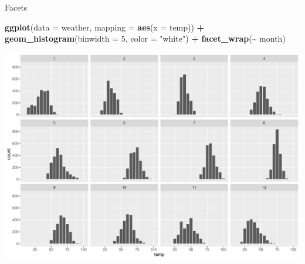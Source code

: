 \documentclass[
  ignorenonframetext,
]{beamer}
\newenvironment{Shaded}{\begin{snugshade}}{\end{snugshade}}
\newcommand{\AttributeTok}[1]{\textcolor[rgb]{0.13,0.29,0.53}{#1}}
\newcommand{\DecValTok}[1]{\textcolor[rgb]{0.00,0.00,0.81}{#1}}
\newcommand{\FunctionTok}[1]{\textcolor[rgb]{0.13,0.29,0.53}{\textbf{#1}}}
\newcommand{\NormalTok}[1]{#1}
\newcommand{\SpecialCharTok}[1]{\textcolor[rgb]{0.81,0.36,0.00}{\textbf{#1}}}
\newcommand{\StringTok}[1]{\textcolor[rgb]{0.31,0.60,0.02}{#1}}
\begin{document}
\begin{frame}[fragile]{Facets}
\protect\hypertarget{facets-1}{}
\tiny

\begin{Shaded}
\begin{Highlighting}[]
\FunctionTok{ggplot}\NormalTok{(}\AttributeTok{data =}\NormalTok{ weather, }\AttributeTok{mapping =} \FunctionTok{aes}\NormalTok{(}\AttributeTok{x =}\NormalTok{ temp)) }\SpecialCharTok{+}
  \FunctionTok{geom\_histogram}\NormalTok{(}\AttributeTok{binwidth =} \DecValTok{5}\NormalTok{, }\AttributeTok{color =} \StringTok{"white"}\NormalTok{) }\SpecialCharTok{+}
  \FunctionTok{facet\_wrap}\NormalTok{(}\SpecialCharTok{\textasciitilde{}}\NormalTok{ month)}
\end{Highlighting}
\end{Shaded}

\begin{center}\includegraphics[width=0.7\linewidth,height=0.7\textheight]{Week2_Lect_files/figure-beamer/unnamed-chunk-31-1} \end{center}
\normalsize
\end{frame}
\end{document}
